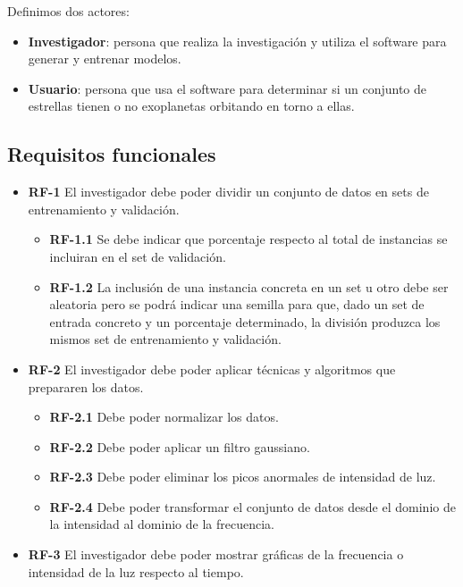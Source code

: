Definimos dos actores:

\begin{itemize}
    \item \textbf{Investigador}: persona que realiza la investigación y utiliza el software para generar y entrenar modelos.
    \item \textbf{Usuario}: persona que usa el software para determinar si un conjunto de estrellas tienen o no exoplanetas orbitando en torno a ellas.
\end{itemize}

\subsection{Requisitos funcionales}
\begin{itemize}

    \item \textbf{RF-1} El investigador debe poder dividir un conjunto de datos en sets de entrenamiento y validación.
        \begin{itemize}
            \item \textbf{RF-1.1} Se debe indicar que porcentaje respecto al total de instancias se incluiran en el set de validación.
            \item \textbf{RF-1.2} La inclusión de una instancia concreta en un set u otro debe ser aleatoria pero se podrá indicar una semilla para que, dado un set de entrada concreto y un porcentaje determinado, la división produzca los mismos set de entrenamiento y validación.            
        \end{itemize}
    
    \item \textbf{RF-2} El investigador debe poder aplicar técnicas y algoritmos que prepararen los datos.
        \begin{itemize}
            \item \textbf{RF-2.1} Debe poder normalizar los datos.
            \item \textbf{RF-2.2} Debe poder aplicar un filtro gaussiano.
            \item \textbf{RF-2.3} Debe poder eliminar los picos anormales de intensidad de luz.
            \item \textbf{RF-2.4} Debe poder transformar el conjunto de datos desde el dominio de la intensidad al dominio de la frecuencia.            
        \end{itemize}

    \item \textbf{RF-3} El investigador debe poder mostrar gráficas de la frecuencia o intensidad de la luz respecto al tiempo.
    

\end{itemize}
